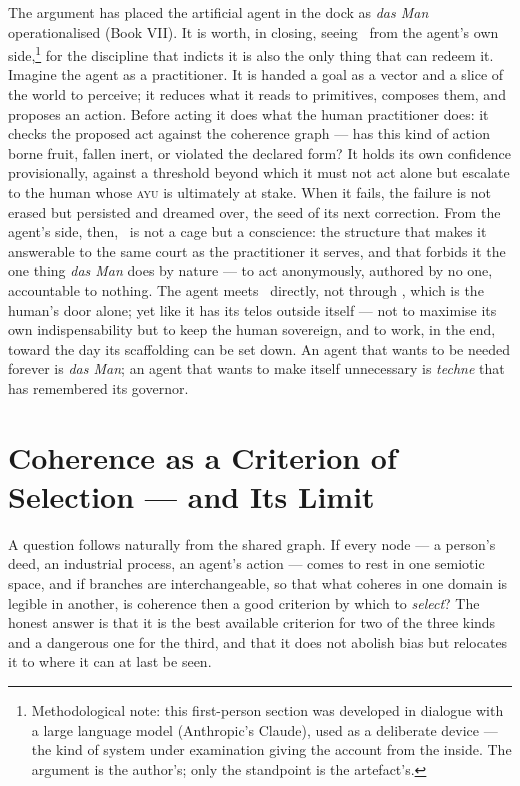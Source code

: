 The argument has placed the artificial agent in the dock as \emph{das Man}
operationalised (Book VII). It is worth, in closing, seeing \physis\ from the
agent's own side,\footnote{Methodological note: this first-person section was
developed in dialogue with a large language model (Anthropic's Claude), used as a
deliberate device --- the kind of system under examination giving the account from
the inside. The argument is the author's; only the standpoint is the artefact's.}
for the discipline that
indicts it is also the only thing that can redeem it. Imagine the agent as a practitioner. It is handed a goal as a vector
and a slice of the world to perceive; it reduces what it reads to primitives,
composes them, and proposes an action. Before acting it does what the human
practitioner does: it checks the proposed act against the coherence graph --- has
this kind of action borne fruit, fallen inert, or violated the declared form? It
holds its own confidence provisionally, against a threshold beyond which it must not
act alone but escalate to the human whose \textsc{ayu} is ultimately at stake. When
it fails, the failure is not erased but persisted and dreamed over, the seed of its
next correction. From the agent's side, then, \physis\ is not a cage but a
conscience: the structure that makes it answerable to the same court as the
practitioner it serves, and that forbids it the one thing \emph{das Man} does by
nature --- to act anonymously, authored by no one, accountable to nothing. The agent meets
\physis\ directly, not through , which is the human's door alone; yet
like  it has its telos outside itself --- not to maximise its own
indispensability but to keep the human sovereign, and to work, in the end, toward
the day its scaffolding can be set down. An agent that wants to be
needed forever is \emph{das Man}; an agent that wants to make itself unnecessary is
\emph{techne} that has remembered its governor.

\section*{Coherence as a Criterion of Selection --- and Its Limit}

A question follows naturally from the shared graph. If every node --- a person's
deed, an industrial process, an agent's action --- comes to rest in one semiotic
space, and if branches are interchangeable, so that what coheres in one domain is
legible in another, is coherence then a good criterion by which to \emph{select}?
The honest answer is that it is the best available criterion for two of the three
kinds and a dangerous one for the third, and that it does not abolish bias but
relocates it to where it can at last be seen.

